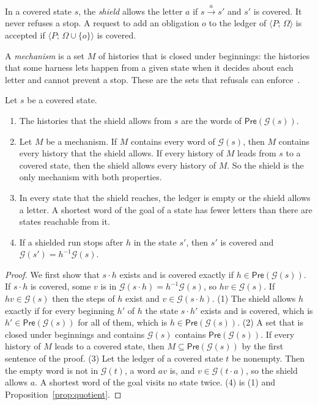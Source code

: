 \documentclass[acmsmall,nonacm,screen]{acmart}
\newcommand{\kw}[1]{\mathsf{#1}}
\newcommand{\st}[2]{\langle #1;\, #2 \rangle}
\newcommand{\pre}[1]{\kw{Pre}(#1)}
\newcommand{\goal}[1]{\mathcal{G}(#1)}
\newcommand{\step}[1]{\xrightarrow{\,#1\,}}
\begin{document}
\begin{definition}[Shield]
In a covered state $s$, the \emph{shield} allows the letter $a$ if $s \step{a} s'$ and $s'$
is covered. It never refuses a stop. A request to add an obligation $o$ to the ledger of
$\st{P}{\Omega}$ is accepted if $\st{P}{\Omega \cup \{o\}}$ is covered.
\end{definition}

A \emph{mechanism} is a set $M$ of histories that is closed under beginnings: the histories
that some harness lets happen from a given state when it decides about each letter and
cannot prevent a stop. These are the sets that refusals can enforce~\cite{schneider2000}.

\begin{theorem}
\label{thm:shield}
Let $s$ be a covered state.
\begin{enumerate}
\item The histories that the shield allows from $s$ are the words of $\pre{\goal{s}}$.
\item Let $M$ be a mechanism. If $M$ contains every word of $\goal{s}$, then $M$ contains
  every history that the shield allows. If every history of $M$ leads from $s$ to a covered
  state, then the shield allows every history of $M$. So the shield is the only mechanism
  with both properties.
\item In every state that the shield reaches, the ledger is empty or the shield allows a
  letter. A shortest word of the goal of a state has fewer letters than there are states
  reachable from it.
\item If a shielded run stops after $h$ in the state $s'$, then $s'$ is covered and
  $\goal{s'} = h^{-1}\goal{s}$.
\end{enumerate}
\end{theorem}

\begin{proof}
We first show that $s \cdot h$ exists and is covered exactly if $h \in \pre{\goal{s}}$. If
$s \cdot h$ is covered, some $v$ is in $\goal{s \cdot h} = h^{-1}\goal{s}$, so $hv \in
\goal{s}$. If $hv \in \goal{s}$ then the steps of $h$ exist and $v \in \goal{s \cdot h}$.
(1) The shield allows $h$ exactly if for every beginning $h'$ of $h$ the state $s \cdot h'$
exists and is covered, which is $h' \in \pre{\goal{s}}$ for all of them, which is
$h \in \pre{\goal{s}}$. (2) A set that is closed under beginnings and contains $\goal{s}$
contains $\pre{\goal{s}}$. If every history of $M$ leads to a covered state, then
$M \subseteq \pre{\goal{s}}$ by the first sentence of the proof. (3) Let the ledger of a
covered state $t$ be nonempty. Then the empty word is not in $\goal{t}$, a word $av$ is, and
$v \in \goal{t \cdot a}$, so the shield allows $a$. A shortest word of the goal visits no
state twice. (4) is (1) and Proposition~\ref{prop:quotient}.
\end{proof}
\end{document}
